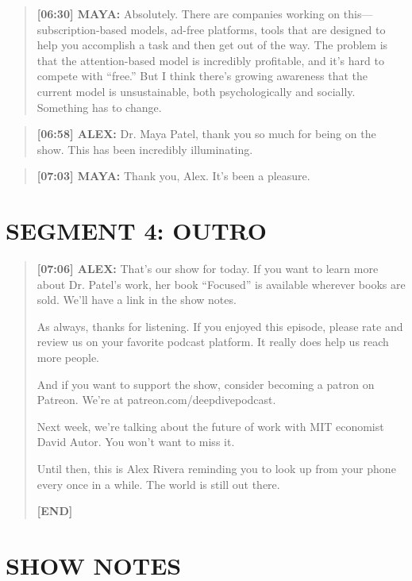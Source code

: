\documentclass[
    language=english,
    doctype=podcast-script,
    institution=none,
]{../../omnilatex}
\begin{document}
\begin{quote}
\textbf{[06:30] MAYA:} Absolutely. There are companies working on this---subscription-based models, ad-free platforms, tools that are designed to help you accomplish a task and then get out of the way. The problem is that the attention-based model is incredibly profitable, and it's hard to compete with ``free.'' But I think there's growing awareness that the current model is unsustainable, both psychologically and socially. Something has to change.
\end{quote}

\begin{quote}
\textbf{[06:58] ALEX:} Dr. Maya Patel, thank you so much for being on the show. This has been incredibly illuminating.
\end{quote}

\begin{quote}
\textbf{[07:03] MAYA:} Thank you, Alex. It's been a pleasure.
\end{quote}

\section*{SEGMENT 4: OUTRO}

\begin{quote}
\textbf{[07:06] ALEX:} That's our show for today. If you want to learn more about Dr. Patel's work, her book ``Focused'' is available wherever books are sold. We'll have a link in the show notes.

As always, thanks for listening. If you enjoyed this episode, please rate and review us on your favorite podcast platform. It really does help us reach more people.

And if you want to support the show, consider becoming a patron on Patreon. We're at patreon.com/deepdivepodcast.

Next week, we're talking about the future of work with MIT economist David Autor. You won't want to miss it.

Until then, this is Alex Rivera reminding you to look up from your phone every once in a while. The world is still out there.

\textbf{[END]}
\end{quote}

\section*{SHOW NOTES}
\end{document}
